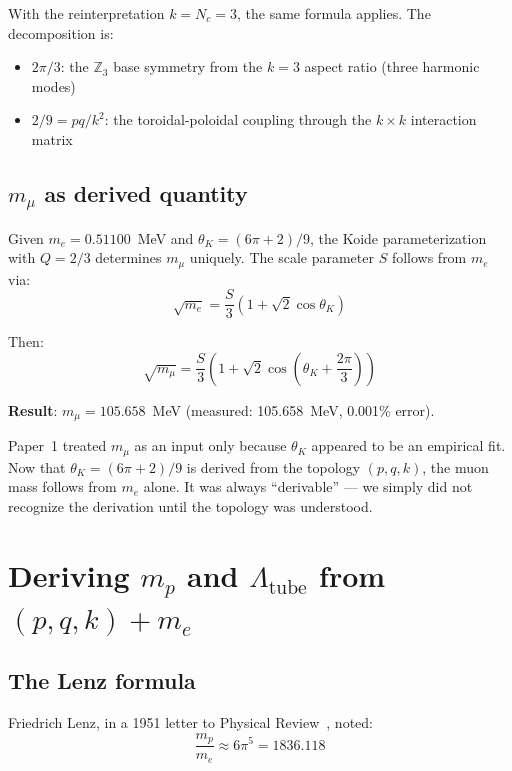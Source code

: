 \documentclass[11pt,a4paper]{article}
\begin{document}
With the reinterpretation $k = N_c = 3$, the same formula applies. The decomposition is:
\begin{itemize}
  \item $2\pi/3$: the $\mathbb{Z}_3$ base symmetry from the $k=3$ aspect ratio (three harmonic modes)
  \item $2/9 = pq/k^2$: the toroidal-poloidal coupling through the $k \times k$ interaction matrix
\end{itemize}

\subsection{$m_\mu$ as derived quantity}

Given $m_e = 0.51100$~MeV and $\theta_K = (6\pi+2)/9$, the Koide parameterization with $Q = 2/3$ determines $m_\mu$ uniquely. The scale parameter $S$ follows from $m_e$ via:
\begin{equation}
  \sqrt{m_e} = \frac{S}{3}\!\left(1 + \sqrt{2}\cos\theta_K\right)
\end{equation}

Then:
\begin{equation}
  \sqrt{m_\mu} = \frac{S}{3}\!\left(1 + \sqrt{2}\cos\!\left(\theta_K + \frac{2\pi}{3}\right)\right)
\end{equation}

\textbf{Result}: $m_\mu = 105.658$~MeV (measured: 105.658~MeV, 0.001\% error).

Paper~1 treated $m_\mu$ as an input only because $\theta_K$ appeared to be an empirical fit. Now that $\theta_K = (6\pi+2)/9$ is derived from the topology $(p, q, k)$, the muon mass follows from $m_e$ alone. It was always ``derivable'' --- we simply did not recognize the derivation until the topology was understood.

\section{Deriving $m_p$ and $\Lambda_{\text{tube}}$ from $(p, q, k) + m_e$}
\label{sec:proton}

\subsection{The Lenz formula}

Friedrich Lenz, in a 1951 letter to Physical Review~\cite{lenz1951}, noted:
\begin{equation}
  \frac{m_p}{m_e} \approx 6\pi^5 = 1836.118
  \label{eq:lenz}
\end{equation}
\end{document}
